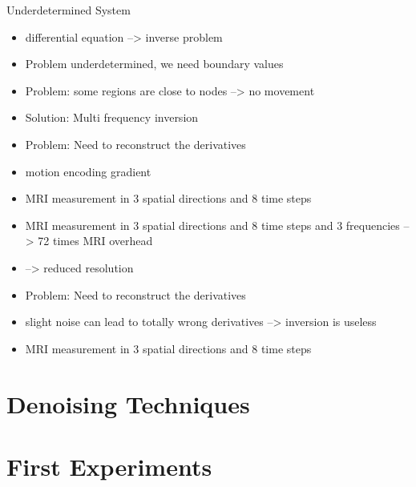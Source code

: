 \begin{frame}{Underdetermined System}


\begin{itemize}
 \item differential equation --> inverse problem
 \item Problem underdetermined, we need boundary values
 \item Problem: some regions are close to nodes --> no movement
 \item Solution: Multi frequency inversion
 \item Problem: Need to reconstruct the derivatives
 \item motion encoding gradient
 \item MRI measurement in 3 spatial directions and 8 time steps
\end{itemize}

\begin{itemize}
 \item MRI measurement in 3 spatial directions and 8 time steps and 3 frequencies --> 72 times MRI overhead
 \item --> reduced resolution
\end{itemize}

\begin{itemize}

 \item Problem: Need to reconstruct the derivatives
 \item slight noise can lead to totally wrong derivatives --> inversion is useless
 \item MRI measurement in 3 spatial directions and 8 time steps
\end{itemize}

\end{frame}

\section{Denoising Techniques}



\section{First Experiments}


